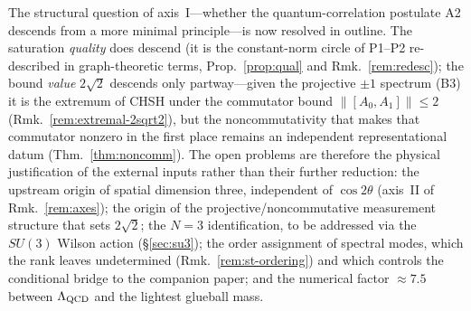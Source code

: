 \documentclass[11pt]{article}
\begin{document}
The structural question of axis~I---whether the quantum-correlation postulate A2 descends
from a more minimal principle---is now resolved in outline. The saturation \emph{quality}
does descend (it is the constant-norm circle of P1--P2 re-described in graph-theoretic terms,
Prop.~\ref{prop:qual} and Rmk.~\ref{rem:redesc}); the bound \emph{value} $2\sqrt2$ descends
only partway---given the projective $\pm1$ spectrum (B3) it is the extremum of CHSH under the
commutator bound $\|[A_0,A_1]\|\le2$ (Rmk.~\ref{rem:extremal-2sqrt2}), but the
noncommutativity that makes that commutator nonzero in the first place remains an independent
representational datum (Thm.~\ref{thm:noncomm}). The open problems are therefore the physical
justification of the external inputs rather than their further reduction: the upstream origin
of spatial dimension three, independent of $\cos2\theta$ (axis~II of Rmk.~\ref{rem:axes}); the
origin of the projective/noncommutative measurement structure that sets $2\sqrt2$; the $N=3$
identification, to be addressed via the $SU(3)$ Wilson action (\S\ref{sec:su3}); the
order assignment of spectral modes, which the rank leaves undetermined
(Rmk.~\ref{rem:st-ordering}) and which controls the conditional bridge to the companion
paper; and the
numerical factor $\approx7.5$ between $\Lambda_{\mathrm{QCD}}$ and the lightest glueball mass.
\end{document}
